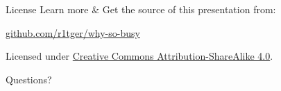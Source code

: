 \documentclass[aspectratio=169]{beamer}
\begin{document}
    \begin{frame}{License}
        Learn more \& Get the source of this presentation from:
        \begin{center}\url{github.com/r1tger/why-so-busy}\end{center}
        Licensed under \href{http://creativecommons.org/licenses/by-sa/4.0/}{Creative Commons Attribution-ShareAlike 4.0}.
        \begin{center}\ccbysa\end{center}
    \end{frame}

    \begin{frame}[standout]
        Questions?
    \end{frame}




\end{document}
